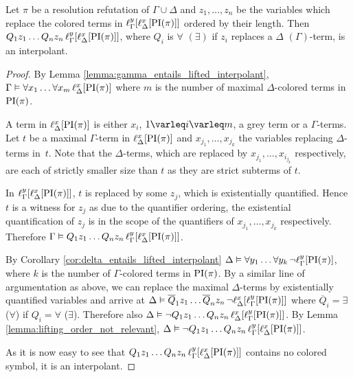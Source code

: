 \begin{thm}
	Let $\pi$ be a resolution refutation of $\Gamma \cup \Delta$ and
	$z_1, \dots, z_n$ be the variables which replace the colored terms in $\lifgamma{\lifdelta{\PI(\pi)}}$ ordered by their length.
	Then
	$Q_1 z_1 \ldots Q_n z_n\,\lifgamma{\lifdelta{\PI(\pi)}}$, where $Q_i$ is $\forall$ $(\exists)$ if $z_i$ replaces a $\Delta$ $(\Gamma)$-term, is an interpolant.
\end{thm}
\begin{proof}
	By Lemma \ref{lemma:gamma_entails_lifted_interpolant}, $\Gamma \entails \forall x_1 \ldots \forall x_m\,\lifdelta{\PI(\pi)}$ where $m$ is the number of maximal $\Delta$-colored terms in $\PI(\pi)$.

	A term in $\lifdelta{\PI(\pi)}$ is either $x_i$, $1 \varleq i \varleq m$, a grey term or a $\Gamma$-terms.
	Let $t$ be a maximal $\Gamma$-term in $\lifdelta{\PI(\pi)}$ and $x_{j_1}, \dots, x_{j_k}$ the variables replacing $\Delta$-terms in~$t$.
	Note that the $\Delta$-terms, which are replaced by $x_{j_1}, \ldots, x_{i_{j_k}}$ respectively, are each of strictly smaller size than $t$ as they are strict subterms of $t$.


	In $\lifgamma{\lifdelta{\PI(\pi)}}$, $t$ is replaced by some $z_j$, which is existentially quantified.
	Hence $t$ is a witness for $z_j$ as due to the quantifier ordering,
	the existential quantification of $z_j$ is in the scope of the quantifiers of $x_{j_1}, \ldots, x_{j_k}$ respectively.
	Therefore $\Gamma \entails Q_1 z_1 \ldots Q_n z_n\,\lifgamma{\lifdelta{\PI(\pi)}}$.

	By Corollary \ref{cor:delta_entails_lifted_interpolant} $\Delta \entails \forall y_1 \dots \forall y_k\,\lnot \lift{\Gamma}{\PI(\pi)}{y}$, where $k$ is the number of $\Gamma$-colored terms in $\PI(\pi)$.
	By a similar line of argumentation as above, we can replace the maximal $\Delta$-terms by existentially quantified variables and arrive at
	$\Delta \entails\nolinebreak{} \overline Q_1 z_1 \dots \overline Q_n z_n\,\lnot \lft{\Delta}{x}{\lft{\Gamma}{y}{\PI(\pi)}}$ where $\overline Q_i = \exists$ ($\forall$) if $Q_i = \forall$ ($\exists$).
	Therefore also
	$\Delta \entails\nolinebreak{} \lnot Q_1 z_1 \dots Q_n z_n\,\lft{\Delta}{x}{\lft{\Gamma}{y}{\PI(\pi)}}$.
	By Lemma \ref{lemma:lifting_order_not_relevant},
	$\Delta \entails\nolinebreak{} \lnot Q_1 z_1 \dots Q_n z_n\,\lft{\Gamma}{y}{\lft{\Delta}{x}{\PI(\pi)}}$.

	As it is now easy to see that $Q_1 z_1 \dots Q_n z_n\,\lft{\Gamma}{y}{\lft{\Delta}{x}{\PI(\pi)}}$ contains no colored symbol, it is an interpolant.
\end{proof}





